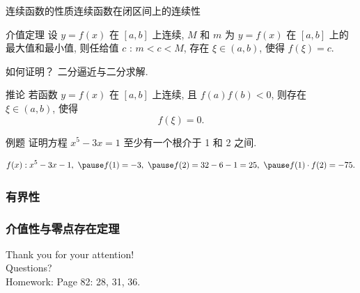 \documentclass[
10pt,
aspectratio=43,
]{beamer}
\begin{document}
				\begin{frame}{连续函数的性质}{连续函数在闭区间上的连续性}
					\begin{block}{介值定理}
						设 $y=f(x)$ 在 $[a, b]$ 上连续, $M$ 和 $m$ 为 $y=f(x)$ 在 $[a, b]$ 上的最大值和最小值, 则任给值 $c$ : $m<c<M$, 存在 $\xi \in(a, b)$, 使得 $f(\xi)=c$.
					\end{block}
					\pause 如何证明？ \pause 二分逼近与二分求解.
					\begin{block}{推论}
						若函数 $y=f(x)$ 在 $[a, b]$ 上连续, 且 $f(a) f(b)<0$, 则存在 $\xi \in(a, b)$, 使得
						$$
						f(\xi)=0 .
						$$
					\end{block}
					
					\begin{exampleblock}{例题}
						证明方程 $x^5-3 x=1$ 至少有一个根介于 1 和 2 之间.
					\end{exampleblock}
					\begin{equation*}
						f(x):x^5-3 x-1, \,\, \pause f(1)=-3, \,\, \pause f(2)=32-6-1=25,\,\, \pause f(1)\cdot f(2) =-75.
					\end{equation*}
				\end{frame}
				
				\subsubsection{有界性}
				\subsubsection{介值性与零点存在定理}
				
				
				
				
				\begin{frame}[plain]
					\vfill
					\centering
					{
						\centering \Huge \color{white} Thank you for your attention!\\[10pt]Questions?\bigskip \\
						Homework: Page 82: 28, 31, 36.
					}
					\vfill
				\end{frame}
				
				
\end{document}
